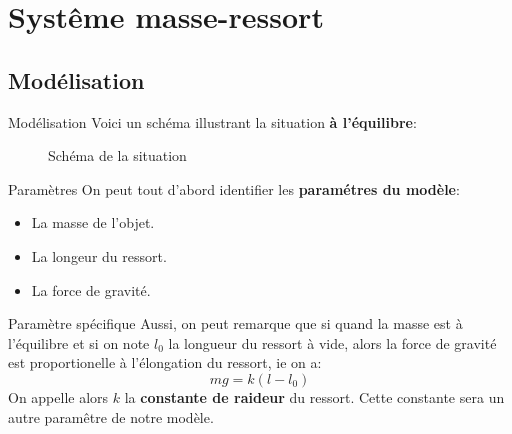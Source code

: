 \documentclass{beamer}
\begin{document}
    \section{Systême masse-ressort}
        \subsection{Modélisation}
            \begin{frame}{Modélisation}
                Voici un schéma illustrant la situation \textbf{à l'équilibre}:
                \begin{figure}
                    \centering
                    \caption{Schéma de la situation}
                \end{figure}
            \end{frame}
            \begin{frame}{Paramètres}
                On peut tout d'abord identifier les \textbf{paramétres du modèle}:
                \begin{itemize}
                    \item La masse de l'objet.
                    \item La longeur du ressort.
                    \item La force de gravité.
                \end{itemize}
            \end{frame}
            \begin{frame}{Paramètre spécifique}
                Aussi, on peut remarque que si quand la masse est à l'équilibre et si on note \(l_0\) la longueur du ressort à vide, alors la force de gravité est proportionelle à l'élongation du ressort, ie on a:
                \[
                mg = k(l - l_0)
                \]
                On appelle alors \(k\) la \textbf{constante de raideur} du ressort. Cette constante sera un autre paramêtre de notre modèle.
            \end{frame}
\end{document}
